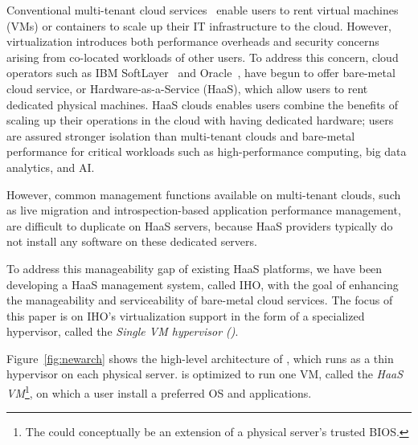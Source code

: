 Conventional multi-tenant cloud services~\cite{ec2,azure,gcp} enable
users to rent virtual machines (VMs) or containers to scale 
up their IT infrastructure to the cloud. However, virtualization
introduces both performance overheads and security concerns
arising from co-located workloads of other users.
To address this concern, cloud operators 
such as  IBM SoftLayer~\cite{softlayer} and Oracle~\cite{oracle},
have begun to offer bare-metal cloud service, or Hardware-as-a-Service (HaaS),
which allow users to rent dedicated  physical machines.
HaaS clouds enables users combine the benefits of 
scaling up their operations in the cloud with having dedicated 
hardware; users are assured stronger isolation than multi-tenant clouds and 
bare-metal performance for critical workloads 
such as high-performance computing, big data analytics, and AI.

However, common management functions available on multi-tenant clouds,
such as live migration and introspection-based 
application performance management, are difficult to 
duplicate on HaaS servers, because HaaS providers typically 
do not install any software on these dedicated servers.

To address this manageability gap of existing HaaS platforms, 
we have been developing a HaaS management system, called 
IHO,
with the goal of enhancing the manageability and serviceability 
of bare-metal cloud services.
The focus of this paper is on IHO's virtualization support
in the form of a specialized hypervisor, called the {\em Single VM
hypervisor (\sna)}.



Figure~\ref{fig:newarch} shows the high-level
architecture of \sna, which runs as a thin hypervisor on each
physical server. \na is optimized to run one VM, called the 
{\em HaaS VM}\footnote{The \na could conceptually be an extension of a physical server's trusted BIOS.}, 
on which  a user install a preferred OS and applications. 


